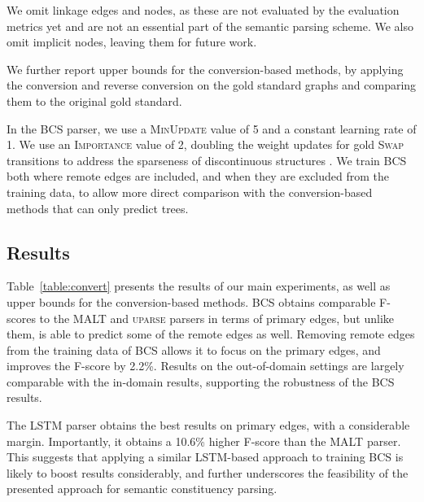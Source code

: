 \documentclass[11pt]{article}
\newcommand{\tabref}[1]{Table~\ref{#1}}
\begin{document}
We omit linkage edges and nodes, as these are not evaluated
by the evaluation metrics yet and are not an essential part of the
semantic parsing scheme.
We also omit implicit nodes, leaving them for future work.

We further report upper bounds for the conversion-based methods, by applying
the conversion and reverse conversion on the gold standard graphs and comparing
them to the original gold standard.

In the \textsc{BCS} parser, we use a \textsc{MinUpdate}
value of 5 and a constant learning rate of 1.
We use an \textsc{Importance} value of 2, doubling the weight updates for gold \textsc{Swap} transitions to address the sparseness of discontinuous structures \cite{maier2015discontinuous}.
We train \textsc{BCS} both where remote edges
are included, and when they are excluded from the training data, to allow
more direct comparison with the conversion-based methods that can only
predict trees.

\subsection{Results}

\tabref{table:convert} presents the results of our main experiments, as well as
upper bounds for the conversion-based methods.
\textsc{BCS} obtains comparable F-scores to the MALT and \textsc{uparse} parsers
in terms of primary edges, but unlike them, is able to predict some
of the remote edges as well. 
Removing remote edges from the training data of \textsc{BCS} allows it to focus
on the primary edges, and improves the F-score by 2.2\%. Results on
the out-of-domain settings are largely comparable with the in-domain
results, supporting the robustness of the \textsc{BCS} results.

The LSTM parser obtains the best results on primary edges, with a considerable margin.
Importantly, it obtains a 10.6\% higher F-score than the MALT parser.
This suggests that applying a similar LSTM-based approach to training \textsc{BCS} is
likely to boost results considerably, and further underscores the feasibility
of the presented approach for semantic constituency parsing. 

\end{document}
